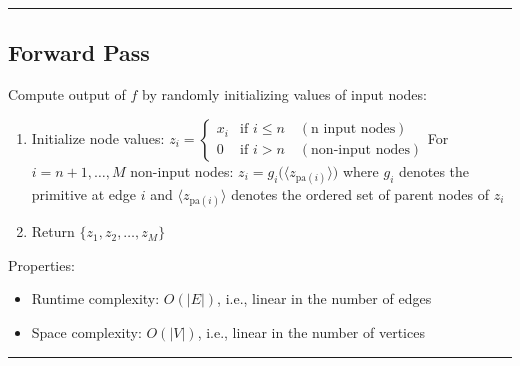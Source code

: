 {\color{black}\hrule height 0.001mm}

\subsection*{Forward Pass}
Compute output of $f$ by randomly initializing values of input nodes:
\begin{enumerate}
    \item Initialize node values:
    $
    z_i =
    \begin{cases}
    x_i & \textrm{if } i \leq n \quad (\textrm{n input nodes}) \\
    0 & \textrm{if } i > n \quad (\textrm{non-input nodes})
    \end{cases}
    $For $i = n+1, \dots, M$ non-input nodes:
    $
    z_i = g_i\big(\langle z_{\textrm{pa}(i)} \rangle\big)
    $
    where $g_i$ denotes the primitive at edge $i$ and $\langle z_{\textrm{pa}(i)} \rangle$ denotes the ordered set of parent nodes of $z_i$
    \item Return $\{z_1, z_2, \dots, z_M\}$
\end{enumerate}
Properties:
\begin{itemize}
    \item Runtime complexity: $O(|E|)$, i.e., linear in the number of edges
    \item Space complexity: $O(|V|)$, i.e., linear in the number of vertices
\end{itemize}

{\color{black}\hrule height 0.001mm}

